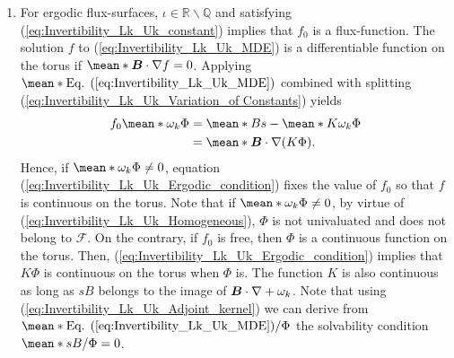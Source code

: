 \begin{enumerate}
	\item For ergodic flux-surfaces, $\iota\in\mathbb{R}\backslash \mathbb{Q}$ and satisfying (\ref{eq:Invertibility_Lk_Uk_constant}) implies that $f_0$ is a flux-function. The solution $f$ to (\ref{eq:Invertibility_Lk_Uk_MDE}) is a differentiable function on the torus if $\mean*{\vb*{B}\cdot\nabla f} = 0$. Applying $\mean*{\text{Eq. (\ref{eq:Invertibility_Lk_Uk_MDE})}}$ combined with splitting (\ref{eq:Invertibility_Lk_Uk_Variation_of Constants}) yields
	\begin{align}
		f_0\mean*{\omega_k \Phi}  & = \mean*{B s} - \mean*{K \omega_k \Phi} \nonumber
		\\
		& = \mean*{\vb*{B}\cdot\nabla(K \Phi)}. \label{eq:Invertibility_Lk_Uk_Ergodic_condition}
	\end{align}
    Hence, if $\mean*{\omega_k \Phi} \ne 0$, equation (\ref{eq:Invertibility_Lk_Uk_Ergodic_condition}) fixes the value of $f_0$ so that $f$ is continuous on the torus. Note that if $\mean*{\omega_k \Phi} \ne 0$, by virtue of (\ref{eq:Invertibility_Lk_Uk_Homogeneous}), $\Phi$ is not univaluated and does not belong to $\mathcal{F}$. On the contrary, if $f_0$ is free, then $\Phi$ is a continuous function on the torus. Then, (\ref{eq:Invertibility_Lk_Uk_Ergodic_condition}) implies that $K\Phi$ is continuous on the torus when $\Phi$ is. The function $K$ is also continuous as long as $sB$ belongs to the image of $\vb*{B}\cdot \nabla + \omega_k$. Note that using (\ref{eq:Invertibility_Lk_Uk_Adjoint_kernel}) we can derive from $\mean*{\text{Eq. (\ref{eq:Invertibility_Lk_Uk_MDE})}/\Phi}$ the solvability condition $\mean*{sB/\Phi}=0$.
    

\end{enumerate}
